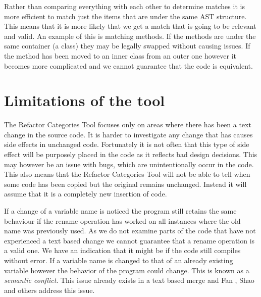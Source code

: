 
% 
% 

Rather than comparing everything with each other to determine matches it is more efficient to match just the items that are under the same AST structure.  This means that it is more likely that we get a match that is going to be relevant and valid.  An example of this is matching methods. If the methods are under the same container (a class) they may be legally swapped without causing issues.  If the method has been moved to an inner class from an outer one however it becomes more complicated and we cannot guarantee that the code is equivalent.  


\section{Limitations of the tool}
The Refactor Categories Tool focuses only on areas where there has been a text change in the source code. 
It is harder to investigate any change that has causes side effects in unchanged code.  Fortunately it is not often that this type of side effect will be purposely placed in the code as it reflects bad design decisions.  This may however be an issue with bugs, which are unintentionally occur in the code.  
This also means that the Refactor Categories Tool will not be able to tell when some code has been copied but the original remains unchanged. Instead it will assume that it is a completely new insertion of code.

If a change of a variable name is noticed the program still retains the same behaviour if the rename operation has worked on all instances where the old name was previously used.  As we do not examine parts of the code that have not experienced a text based change we cannot guarantee that a rename operation is a valid one. We have an indication that it might be if the code still compiles without error. If a variable name is changed to that of an already existing variable however the behavior of the program could change. This is known as a \emph{semantic conflict}.  This issue already exists in a text based merge and Fan \cite{Fan2012}, Shao \cite{Shao2009} and others address this issue. 

